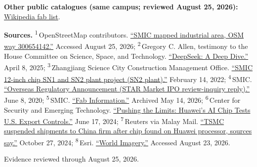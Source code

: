 \begin{minipage}[t][0.90\textheight][t]{\textwidth}
\begin{itemize}[leftmargin=1.25em,itemsep=0.35em,topsep=0.15em,parsep=0pt]
\end{itemize}
\smallskip
{\sffamily\scriptsize\color{black!62}\textbf{Other public catalogues (same campus; reviewed August 25, 2026):} \href{\detokenize{https://en.wikipedia.org/w/index.php?title=List_of_semiconductor_fabrication_plants&oldid=1370451124}\#\detokenize{Open_plants}}{Wikipedia fab list}.\par}
\medskip
{\sffamily\scriptsize\setlength{\emergencystretch}{1.5em}\textbf{Sources.} \textsuperscript{1}\,OpenStreetMap contributors. \href{\detokenize{https://www.openstreetmap.org/way/300654142}}{\enquote{SMIC mapped industrial area, OSM way 300654142.}} Accessed August 25, 2026; \textsuperscript{2}\,Gregory C. Allen, testimony to the House Committee on Science, Space, and Technology. \href{\detokenize{https://www.congress.gov/119/meeting/house/118111/witnesses/HMTG-119-SY15-Wstate-AllenG-20250408.pdf}}{\enquote{DeepSeek: A Deep Dive.}} April 8, 2025; \textsuperscript{3}\,Zhangjiang Science City Construction Management Office. \href{\detokenize{https://www.pudong.gov.cn/zwgk/14496.gkml_ywl_czxx_czyjs_kfqgwh_zjyqgwh_shszjkxcjsglbgsbb/2022/301/252143.html}}{\enquote{SMIC 12-inch chip SN1 and SN2 plant project (SN2 plant).}} February 14, 2022; \textsuperscript{4}\,SMIC. \href{\detokenize{https://www1.hkexnews.hk/listedco/listconews/sehk/2020/0608/2020060801093_c.pdf}}{\enquote{Overseas Regulatory Announcement (STAR Market IPO review-inquiry reply).}} June 8, 2020; \textsuperscript{5}\,SMIC. \href{\detokenize{https://web.archive.org/web/20260514171941/https://www.smics.com/en/site/factory_summary}}{\enquote{Fab Information.}} Archived May 14, 2026; \textsuperscript{6}\,Center for Security and Emerging Technology. \href{\detokenize{https://cset.georgetown.edu/publication/pushing-the-limits-huaweis-ai-chip-tests-u-s-export-controls/}}{\enquote{Pushing the Limits: Huawei's AI Chip Tests U.S. Export Controls.}} June 17, 2024; \textsuperscript{7}\,Reuters via Malay Mail. \href{\detokenize{https://www.malaymail.com/news/money/2024/10/27/tsmc-suspended-shipments-to-china-firm-after-chip-found-on-huawei-processor-sources-say/155003}}{\enquote{TSMC suspended shipments to China firm after chip found on Huawei processor, sources say.}} October 27, 2024; \textsuperscript{8}\,Esri. \href{\detokenize{https://www.arcgis.com/home/item.html?id=10df2279f9684e4a9f6a7f08febac2a9}}{\enquote{World Imagery.}} Accessed August 23, 2026.\par}
\vfill
\noindent{\color{hairline}\rule{\linewidth}{0.4pt}}\par\smallskip
{\sffamily\scriptsize\color{black!58} Evidence reviewed through August 25, 2026.\par}
\end{minipage}
